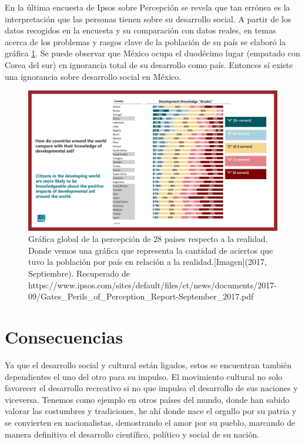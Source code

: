 En la última encuesta de Ipsos sobre Percepción\cite{pp04} se revela que tan errónea es la interpretación que las personas tienen sobre su desarrollo social. A partir de los datos recogidos en la encuesta y su comparación con datos reales, en temas acerca de los problemas y rasgos clave de la población de su país se elaboró la gráfica \ref{fig:ipso}. Se puede observar que México ocupa el duodécimo lugar (empatado con Corea del sur) en ignorancia total de su desarrollo como país. Entonces sí existe una ignorancia sobre desarrollo social en México.
\\[1pt]

\begin{figure}
	\centering 
	\includegraphics[width=\textwidth]{03MarcoTeorico/imageR/ipso.jpg}
	\caption{Gráfica global de la percepción de 28 paises respecto a la realidad. Donde vemos una gráfica que representa la cantidad de aciertos que tuvo la población por país en relación a la realidad.[Imagen](2017, Septiembre). Recuperado de https://www.ipsos.com/sites/default/files/ct/news/documents/2017-09/Gates\_Perils\_of\_Perception\_Report-September\_2017.pdf}
	\label{fig:ipso}
\end{figure}

\section{Consecuencias}
Ya que el desarrollo social y cultural están ligados, estos se encuentran también dependientes el uno del otro para su impulso. El movimiento cultural no solo favorecer el desarrollo recreativo si no que impulsa el desarrollo de sus naciones y viceversa. Tenemos como ejemplo en otros países del mundo, donde han sabido valorar las costumbres y tradiciones, he ahí donde nace el orgullo por su patria y se convierten en nacionalistas, demostrando el amor por su pueblo, marcando de manera definitiva el desarrollo científico, político y social de su nación\cite{pp06}.
\\[1pt]


